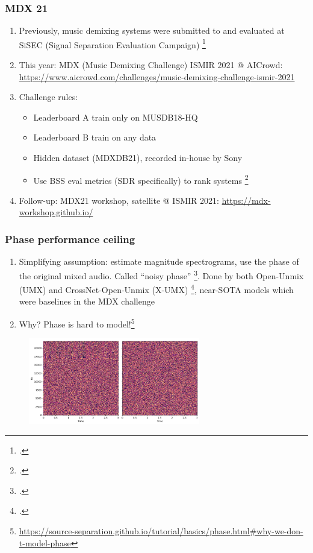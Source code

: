 \documentclass[usenames,dvipsnames]{beamer}
\begin{document}
\begin{frame}
	\frametitle{MDX 21}
	\begin{enumerate}
		\item
			Previously, music demixing systems were submitted to and evaluated at SiSEC (Signal Separation Evaluation Campaign) \footcite{sisec2016, sisec2018}
		\item
			This year: MDX (Music Demixing Challenge) ISMIR 2021 @ AICrowd: \url{https://www.aicrowd.com/challenges/music-demixing-challenge-ismir-2021}
		\item
			Challenge rules:
			\begin{itemize}
				\item
					Leaderboard A train only on MUSDB18-HQ
				\item
					Leaderboard B train on any data
				\item
					Hidden dataset (MDXDB21), recorded in-house by Sony
				\item
					Use BSS eval metrics (SDR specifically) to rank systems \footcite{bss, bss2}
			\end{itemize}
		\item
			Follow-up: MDX21 workshop, satellite @ ISMIR 2021: \url{https://mdx-workshop.github.io/}
	\end{enumerate}
\end{frame}

\begin{frame}
	\frametitle{Phase performance ceiling}
	\begin{enumerate}
		\item
			Simplifying assumption: estimate magnitude spectrograms, use the phase of the original mixed audio. Called ``noisy phase'' \footcite{noisyphase1}. Done by both Open-Unmix (UMX) and CrossNet-Open-Unmix (X-UMX) \footcite{umx, xumx}, near-SOTA models which were baselines in the MDX challenge
		\item
			Why? Phase is hard to model!\footnote{\url{https://source-separation.github.io/tutorial/basics/phase.html\#why-we-don-t-model-phase}}
	\end{enumerate}
	\begin{figure}[ht]
		\centering
		\includegraphics[width=7.5cm]{./images-mss/whynophase.png}
	\end{figure}
\end{frame}
\end{document}
